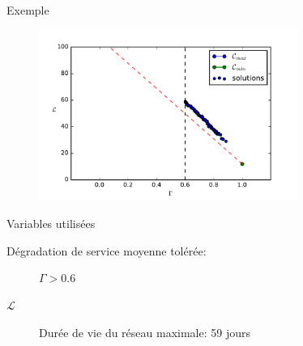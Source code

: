 \begin{frame}{Exemple}

  \begin{figure}[tb]
    \centering
    \includegraphics[width=0.75\textwidth]{figures/pareto_06.pdf}
  \end{figure}

  \begin{block}{Variables utilisées}
    \begin{description}
      \item[Dégradation de service moyenne tolérée:] $\Gamma > 0.6$
      \item[$\mathcal{L}$] Durée de vie du réseau maximale: 59 jours
    \end{description}
  \end{block}

\end{frame}


